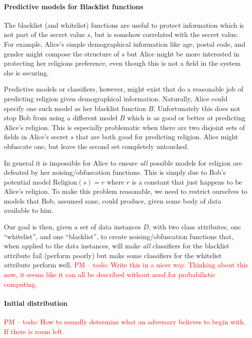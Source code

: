 \documentclass{article} %
\newcommand{\pxm}[1]{\textcolor{red}{PM -- #1}}
\theoremstyle{plain} %
\theoremstyle{definition} %
\begin{document}
\paragraph*{Predictive models for Blacklist functions} The blacklist
(and whitelist) functions are useful to protect information which is
not part of the secret value $ s $, but is somehow correlated with the
secret value. For example, Alice's simple demographical information
like age, postal code, and gender might compose the structure of $ s $
but Alice might be more interested in protecting her religions
preference, even though this is not a field in the system she is
securing.

Predictive models or classifiers, however, might exist that do a
reasonable job of predicting religion given demographical
information. Naturally, Alice could specify one such model as her
blacklist function $ B $. Unfortunately this does not stop Bob from
using a different model $ B $ which is as good or better at predicting
Alice's religion. This is especially problematic when there are two
disjoint sets of fields in Alice's secret $ s $ that are both good for
predicting religion. Alice might obfuscate one, but leave the second
set completely untouched.

In general it is impossible for Alice to ensure \emph{all} possible
models for religion are defeated by her noising/obfuscation
functions. This is simply due to Bob's potential model $
\text{Religion}(s) = r $ where $ r $ is a constant that just happens
to be Alice's religion. To make this problem reasonable, we need to
restrict ourselves to models that Bob, assumed sane, could produce,
given some body of data available to him.

Our goal is then, given a set of data instances $ D $, with two class
attributes, one ``whitelist'', and one ``blacklist'', to create
noising/obfuscation functions that, when applied to the data
instances, will make \emph{all} classifiers for the blacklist
attribute fail (perform poorly) but make some classifiers for the
whitelist attribute perform well. \pxm{todo: Write this in a nicer
  way. Thinking about this now, it seems like it can all be described
  without need for probabilistic computing.}

\paragraph*{Initial distribution}

\pxm{todo: How to soundly determine what an adversary believes to begin
  with. If there is room left.}
\end{document}
